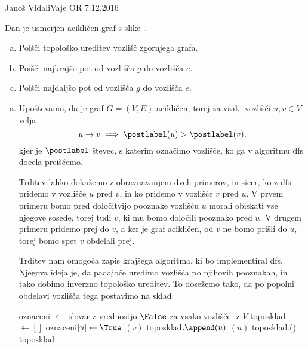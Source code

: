 \begin{naloga}{Janoš Vidali}{Vaje OR 7.12.2016}
\begin{vprasanje}
Dan je usmerjen acikličen graf s slike~\fig.

\begin{enumerate}[(a)]
\item Poišči topološko ureditev vozlišč zgornjega grafa.

\item Poišči najkrajšo pot od vozlišča $g$ do vozlišča $e$.

\item Poišči najdaljšo pot od vozlišča $g$ do vozlišča $e$.
\end{enumerate}

\begin{slika}
\pgfslika
{}
\end{slika}
\end{vprasanje}
\begin{odgovor}

\begin{enumerate}[(a)]
\item Upoštevamo, da je graf $G = (V, E)$ acikličen,
torej za vsaki vozlišči $u, v \in V$ velja
$$
u \rightarrow v \implies \postlabel(u) > \postlabel(v),
$$
kjer je $\postlabel$ števec, s katerim označimo vozlišče,
ko ga v algoritmu {\sc dfs} docela preiščemo.

Trditev lahko dokažemo z obravnavanjem dveh primerov, in sicer, 
ko z {\sc dfs} pridemo v vozlišče $u$ pred $v$,
in ko pridemo v vozlišče $v$ pred $u$.
V prvem primeru bomo pred določitvijo pooznake vozlišču $u$
morali obiskati vse njegove sosede,
torej tudi $v$, ki mu bomo določili pooznako pred $u$.
V drugem primeru pridemo prej do $v$,
a ker je graf acikličen, od $v$ ne bomo prišli do $u$,
torej bomo spet $v$ obdelali prej.

Trditev nam omogoča zapis krajšega algoritma, ki bo implementiral {\sc dfs}.
Njegova ideja je, da padajoče uredimo vozlišča po njihovih pooznakah, 
in tako dobimo inverzno topološko ureditev.
To dosežemo tako, da po popolni obdelavi vozlišča tega postavimo na sklad.

\begin{small}
\begin{algorithmic}
	\State oznaceni $\gets$ slovar z vrednostjo $\False$ za vsako vozlišče iz $V$
	\State toposklad $\gets []$
		\State oznaceni$[u] \gets \True$
				$(v)$
			\EndIf
		\EndFor
		\State toposklad$.\append(u)$
	\EndFunction
			$(u)$
		\EndIf
	\EndFor
	\State toposklad.\reverse()
	\State \Return toposklad
\EndFunction
\end{algorithmic}
\end{small}


\end{enumerate}
\end{odgovor}
\end{naloga}
